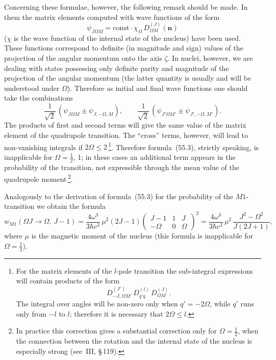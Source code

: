 Concerning these formulae, however, the following remark should be made. In them the matrix elements computed with wave functions of the form
\[
\psi_{J\Omega M} = \mathrm{const}\cdot\chi_\Omega\,D^{(J)}_{\Omega M}(\mathbf{n})
\]
($\chi$ is the wave function of the internal state of the nucleus) have been used. These functions correspond to definite (in magnitude and sign) values of the projection of the angular momentum onto the axis $\zeta$. In nuclei, however, we are dealing with states possessing only definite parity and magnitude of the projection of the angular momentum (the latter quantity is usually and will be understood under $\Omega$). Therefore as initial and final wave functions one should take the combinations
\[
\frac{1}{\sqrt{2}}\,(\psi_{J\Omega M} \pm \psi_{J,-\Omega,M}),\qquad \frac{1}{\sqrt{2}}\,(\psi_{J'\Omega M'} \pm \psi_{J',-\Omega,M'}).
\]
The products of first and second terms will give the same value of the matrix element of the quadrupole transition. The ``cross'' terms, however, will lead to non-vanishing integrals if $2\Omega \leqslant 2$\,\footnote{For the matrix elements of the $l$-pole transition the sub-integral expressions will contain products of the form
\[
D^{(J')}_{-J,\Omega M'}\,D^{(l)}_{q'q}\,D^{(J)}_{\Omega M}.
\]
The integral over angles will be non-zero only when $q' = -2\Omega$, while $q'$ runs only from $-l$ to $l$; therefore it is necessary that $2\Omega \leqslant l$.}. Therefore formula~(55.3), strictly speaking, is inapplicable for $\Omega = \tfrac{1}{2}$, 1; in these cases an additional term appears in the probability of the transition, not expressible through the mean value of the quadrupole moment\,\footnote{In practice this correction gives a substantial correction only for $\Omega = \tfrac{1}{2}$, when the connection between the rotation and the internal state of the nucleus is especially strong (see~III, \S\,119).}.

Analogously to the derivation of formula~(55.3) for the probability of the $M1$-transition we obtain the formula
\begin{equation}
w_{M1}(\Omega J \to \Omega,\,J-1) = \frac{4\omega^3}{3\hbar c^3}\,\mu^2(2J-1)\begin{pmatrix} J-1 & 1 & J \\ -\Omega & 0 & \Omega\end{pmatrix}^{\!2} = \frac{4\omega^3}{3\hbar c^3}\,\mu^2\,\frac{J^2 - \Omega^2}{J(2J+1)},
\tag{55.4}
\end{equation}
where $\mu$ is the magnetic moment of the nucleus (this formula is inapplicable for $\Omega = \tfrac{1}{2}$).
